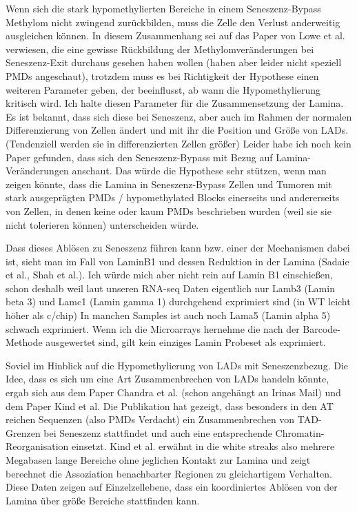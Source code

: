 Wenn sich die stark hypomethylierten Bereiche in einem Seneszenz-Bypass Methylom nicht zwingend zurückbilden, muss die Zelle den Verlust anderweitig ausgleichen können. In diesem Zusammenhang sei auf das Paper von Lowe et al. verwiesen, die eine gewisse Rückbildung der Methylomveränderungen bei Seneszenz-Exit durchaus gesehen haben wollen (haben aber leider nicht speziell PMDs angeschaut), trotzdem muss es bei Richtigkeit der Hypothese einen weiteren Parameter geben, der beeinflusst, ab wann die Hypomethylierung kritisch wird. Ich halte diesen Parameter für die Zusammensetzung der Lamina. Es ist bekannt, dass sich diese bei Seneszenz, aber auch im Rahmen der normalen Differenzierung von Zellen ändert und mit ihr die Position und Größe von LADs. (Tendenziell werden sie in differenzierten Zellen größer) Leider habe ich noch kein Paper gefunden, dass sich den Seneszenz-Bypass mit Bezug auf Lamina-Veränderungen anschaut. Das würde die Hypothese sehr stützen, wenn man zeigen könnte, dass die Lamina in Seneszenz-Bypass Zellen und Tumoren mit stark ausgeprägten PMDs / hypomethylated Blocks einerseits und andererseits von Zellen, in denen keine oder kaum PMDs beschrieben wurden (weil sie sie nicht tolerieren können) unterscheiden würde.

Dass dieses Ablösen zu Seneszenz führen kann bzw. einer der Mechanismen dabei ist, sieht man im Fall von LaminB1 und dessen Reduktion in der Lamina (Sadaie et al., Shah et al.). Ich würde mich aber nicht rein auf Lamin B1 einschießen, schon deshalb weil laut unseren RNA-seq Daten eigentlich nur Lamb3 (Lamin beta 3) und Lamc1 (Lamin gamma 1) durchgehend exprimiert sind (in WT leicht höher als c/chip) In manchen Samples ist auch noch Lama5 (Lamin alpha 5) schwach exprimiert. Wenn ich die Microarrays hernehme die nach der Barcode-Methode ausgewertet sind, gilt kein einziges Lamin Probeset als exprimiert. 

Soviel im Hinblick auf die Hypomethylierung von LADs mit Seneszenzbezug. Die Idee, dass es sich um eine Art Zusammenbrechen von LADs handeln könnte, ergab sich aus dem Paper Chandra et al. (schon angehängt an Irinas Mail) und dem Paper Kind et al. Die Publikation hat gezeigt, dass besonders in den AT reichen Sequenzen (also PMDs Verdacht) ein Zusammenbrechen von TAD-Grenzen bei Seneszenz stattfindet und auch eine entsprechende Chromatin-Reorganisation einsetzt. Kind et al. erwähnt in die white streaks also mehrere Megabasen lange Bereiche ohne jeglichen Kontakt zur Lamina und zeigt berechnet die Assoziation benachbarter Regionen zu gleichartigem Verhalten. Diese Daten zeigen auf Einzelzellebene, dass ein koordiniertes Ablösen von der Lamina über größe Bereiche stattfinden kann.


